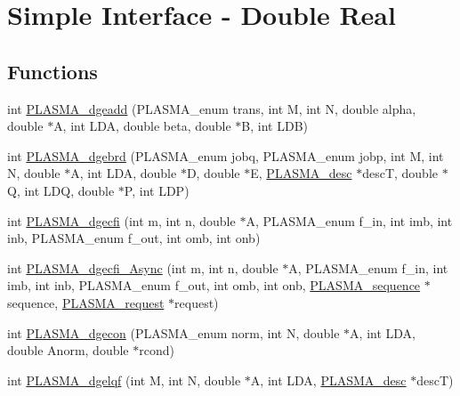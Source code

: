 \hypertarget{group__double}{}\section{Simple Interface -\/ Double Real}
\label{group__double}
\subsection*{Functions}
\begin{DoxyCompactItemize}
\item 
int \hyperlink{group__double_gaf337216ce367c98b6e78e15f05ca928b_gaf337216ce367c98b6e78e15f05ca928b}{P\+L\+A\+S\+M\+A\+\_\+dgeadd} (P\+L\+A\+S\+M\+A\+\_\+enum trans, int M, int N, double alpha, double $\ast$A, int L\+D\+A, double beta, double $\ast$B, int L\+D\+B)
\item 
int \hyperlink{group__double_gaabe52f420c4ae6d1db03f9fb37b8045f_gaabe52f420c4ae6d1db03f9fb37b8045f}{P\+L\+A\+S\+M\+A\+\_\+dgebrd} (P\+L\+A\+S\+M\+A\+\_\+enum jobq, P\+L\+A\+S\+M\+A\+\_\+enum jobp, int M, int N, double $\ast$A, int L\+D\+A, double $\ast$D, double $\ast$E, \hyperlink{structplasma__desc__t}{P\+L\+A\+S\+M\+A\+\_\+desc} $\ast$desc\+T, double $\ast$Q, int L\+D\+Q, double $\ast$P, int L\+D\+P)
\item 
int \hyperlink{group__double_gaaba26003a3814171aaceeae6e18d1303_gaaba26003a3814171aaceeae6e18d1303}{P\+L\+A\+S\+M\+A\+\_\+dgecfi} (int m, int n, double $\ast$A, P\+L\+A\+S\+M\+A\+\_\+enum f\+\_\+in, int imb, int inb, P\+L\+A\+S\+M\+A\+\_\+enum f\+\_\+out, int omb, int onb)
\item 
int \hyperlink{group__double_ga2ab0f34c891002514981a4e9ebf7222f_ga2ab0f34c891002514981a4e9ebf7222f}{P\+L\+A\+S\+M\+A\+\_\+dgecfi\+\_\+\+Async} (int m, int n, double $\ast$A, P\+L\+A\+S\+M\+A\+\_\+enum f\+\_\+in, int imb, int inb, P\+L\+A\+S\+M\+A\+\_\+enum f\+\_\+out, int omb, int onb, \hyperlink{structplasma__sequence__t}{P\+L\+A\+S\+M\+A\+\_\+sequence} $\ast$sequence, \hyperlink{structplasma__request__t}{P\+L\+A\+S\+M\+A\+\_\+request} $\ast$request)
\item 
int \hyperlink{group__double_gaffb6839f6bec9ca91ddba211efecb14c_gaffb6839f6bec9ca91ddba211efecb14c}{P\+L\+A\+S\+M\+A\+\_\+dgecon} (P\+L\+A\+S\+M\+A\+\_\+enum norm, int N, double $\ast$A, int L\+D\+A, double Anorm, double $\ast$rcond)
\item 
int \hyperlink{group__double_ga60fffe07485af5c38c0447efccf8ccfe_ga60fffe07485af5c38c0447efccf8ccfe}{P\+L\+A\+S\+M\+A\+\_\+dgelqf} (int M, int N, double $\ast$A, int L\+D\+A, \hyperlink{structplasma__desc__t}{P\+L\+A\+S\+M\+A\+\_\+desc} $\ast$desc\+T)

\end{DoxyCompactItemize}
